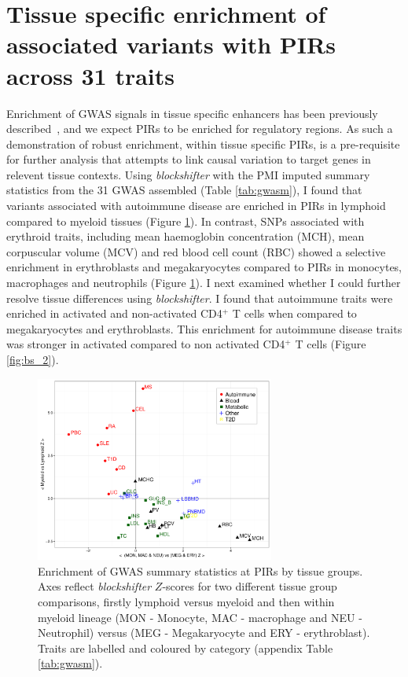\documentclass[a4paper,11pt]{report}
\begin{document}
\section{Tissue specific enrichment of associated variants with PIRs across 31 traits}
Enrichment of GWAS signals in tissue specific enhancers has been previously described~\citep{MauranoHumbertRynesEtAl2012}, and we expect PIRs to be enriched for regulatory regions. As such a demonstration of robust enrichment, within tissue specific PIRs, is a pre-requisite for further analysis that attempts to link causal variation to target genes in relevent tissue contexts.  Using \textit{blockshifter} with the PMI imputed summary statistics from the 31 GWAS assembled (Table \ref{tab:gwasm}), I found that variants associated with autoimmune disease are enriched in PIRs in lymphoid compared to myeloid tissues (Figure \ref{fig:bs_1}). In contrast, SNPs associated with erythroid traits, including mean haemoglobin concentration (MCH), mean corpuscular volume (MCV) and red blood cell count (RBC) showed a selective enrichment in erythroblasts and megakaryocytes compared to PIRs in monocytes, macrophages and neutrophils (Figure \ref{fig:bs_1}). I next examined whether I could further resolve tissue differences using \textit{blockshifter}. I found that autoimmune traits were enriched in activated and non-activated CD4$^{+}$ T cells when compared to megakaryocytes and erythroblasts. This enrichment for autoimmune disease traits was stronger in activated  compared to non activated CD4$^{+}$ T cells (Figure \ref{fig:bs_2}).


\begin{figure}[h]
\centering
\includegraphics[width=0.7\textwidth]{block_shifter_scatter.pdf}
\caption{Enrichment of GWAS summary statistics at PIRs by tissue groups. Axes reflect \textit{blockshifter} $Z$-scores for two different tissue group comparisons, firstly lymphoid versus myeloid and then within myeloid lineage (MON - Monocyte, MAC - macrophage and NEU - Neutrophil) versus (MEG - Megakaryocyte and ERY - erythroblast). Traits are labelled and coloured by category (appendix Table \ref{tab:gwasm}).}
\label{fig:bs_1}
\end{figure}
\end{document}
